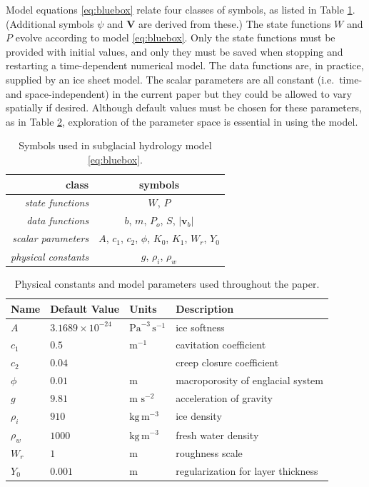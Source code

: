 \documentclass[11pt,final]{amsart}%
\newcommand\bv{\mathbf{v}}
\newcommand\bV{\mathbf{V}}
\begin{document}
Model equations \eqref{eq:bluebox} relate four classes of symbols, as listed in Table \ref{tab:symbols}.  (Additional symbols $\psi$ and $\bV$ are derived from these.)  The state functions $W$ and $P$ evolve according to model \eqref{eq:bluebox}.  Only the state functions must be provided with initial values, and only they must be saved when stopping and restarting a time-dependent numerical model.  The data functions are, in practice, supplied by an ice sheet model.  The scalar parameters are all constant (i.e.~time- and space-independent) in the current paper but they could be allowed to vary spatially if desired.  Although default values must be chosen for these parameters, as in Table \ref{tab:constants}, exploration of the parameter space is essential in using the model.  

\begin{table}[ht]
\caption{Symbols used in subglacial hydrology model \eqref{eq:bluebox}.}
\begin{tabular}{r|c}
class & symbols \\ \hline
\emph{state functions} & $W$, $P$ \\
\emph{data functions} & $b$, $m$, $P_o$, $S$, $|\bv_b|$ \\
\emph{scalar parameters} & $A$, $c_1$, $c_2$, $\phi$, $K_0$, $K_1$, $W_r$, $Y_0$ \\
\emph{physical constants} & $g$, $\rho_i$, $\rho_w$ \\
\hline
\end{tabular}
\label{tab:symbols}
\end{table}

\begin{table}[ht]
  \centering
  \caption{Physical constants and model parameters used throughout the paper.}
  \begin{tabular}{lllp{3.0in}} 
    \textbf{Name} & \textbf{Default Value} & \textbf{Units} & \textbf{Description}\\
\hline
    $A$ & $3.1689\times 10^{-24}$ & $\text{Pa}^{-3}\,\text{s}^{-1}$ & ice softness \citep{EISMINT96} \phantom{$\Big|$} \\
    $c_1$ & $0.5$ & $\text{m}^{-1}$ & cavitation coefficient \\
    $c_2$ & $0.04$ & & creep closure coefficient \\
    $\phi$ & $0.01$ & m & macroporosity of englacial system \\
    $g$ & $9.81$ & m $\text{s}^{-2}$ & acceleration of gravity \\
    $\rho_i$ & $910$ & $\text{kg}\,\text{m}^{-3}$ & ice density \citep{GreveBlatter2009} \\
    $\rho_w$ & $1000$ & $\text{kg}\,\text{m}^{-3}$ & fresh water density \citep{GreveBlatter2009} \\
    $W_r$ & $1$ & $\text{m}$ & roughness scale \\
    $Y_0$ & $0.001$ & m & regularization for layer thickness \\
    \hline
  \end{tabular}
 \label{tab:constants}
\end{table}
\end{document}
